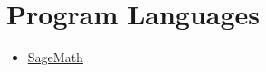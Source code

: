 \documentclass[letterpaper]{article}
\begin{document}
\section*{Program Languages}
\begin{itemize}
\item \href{https://www.sagemath.org/}{SageMath}
\end{itemize}







\end{document}
